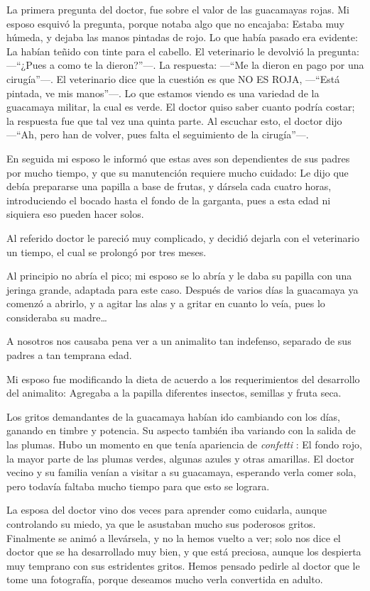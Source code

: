 \documentclass[letterpaper, 12pt]{book}
\begin{document}
La primera pregunta del doctor, fue sobre el valor de las guacamayas rojas. Mi esposo esquivó la pregunta, porque notaba algo que no encajaba: Estaba muy húmeda, y dejaba las manos pintadas de rojo. Lo que había pasado era evidente: La habían teñido con tinte para el cabello. El veterinario le devolvió la pregunta: ---``¿Pues a como te la dieron?''---. La respuesta: ---``Me la dieron en pago por una cirugía''---. El veterinario dice que la cuestión es que NO ES ROJA, ---``Está pintada, ve mis manos''---. Lo que estamos viendo es una variedad de la guacamaya militar, la cual es verde. El doctor quiso saber cuanto podría costar; la respuesta fue que tal vez una quinta parte. Al escuchar esto, el doctor dijo ---``Ah, pero han de volver, pues falta el seguimiento de la cirugía''---.

En seguida mi esposo le informó que estas aves son dependientes de sus padres por mucho tiempo, y que su manutención requiere mucho cuidado: Le dijo que debía prepararse una papilla a base de frutas, y dársela cada cuatro horas, introduciendo el bocado hasta el fondo de la garganta, pues a esta edad ni siquiera eso pueden hacer solos.

Al referido doctor le pareció muy complicado, y decidió dejarla con el veterinario un tiempo, el cual se prolongó por tres meses. 

Al principio no abría el pico; mi esposo se lo abría y le daba su papilla con una jeringa grande, adaptada para este caso. Después de varios días la guacamaya ya comenzó a abrirlo, y a agitar las alas y a gritar en cuanto lo veía, pues lo consideraba su madre\ldots

A nosotros nos causaba pena ver a un animalito tan indefenso, separado de sus padres a tan temprana edad. 

Mi esposo fue modificando la dieta de acuerdo a los requerimientos del desarrollo del animalito: Agregaba a la papilla diferentes insectos, semillas y fruta seca. 

Los gritos demandantes de la guacamaya habían ido cambiando con los días, ganando en timbre y potencia. Su aspecto también iba variando con la salida de las plumas. Hubo un momento en que tenía apariencia de {\it confetti}  : El fondo rojo, la mayor parte de las plumas verdes, algunas azules y otras amarillas. El doctor vecino y su familia venían a visitar a su guacamaya, esperando verla comer sola, pero todavía faltaba mucho tiempo para que esto se lograra. 

La esposa del doctor vino dos veces para aprender como cuidarla, aunque controlando su miedo, ya que le asustaban mucho sus poderosos gritos. Finalmente se animó a llevársela, y no la hemos vuelto a ver; solo nos dice el doctor que se ha desarrollado muy bien, y que está preciosa, aunque los despierta muy temprano con sus estridentes gritos. Hemos pensado pedirle al doctor que le tome una fotografía, porque deseamos mucho verla convertida en adulto.
\end{document}
